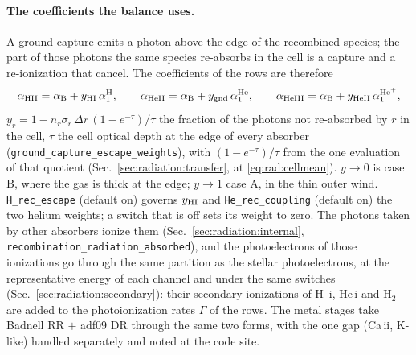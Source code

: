 \paragraph{The coefficients the balance uses.} A ground capture emits a
photon above the edge of the recombined species; the part of those photons
the same species re-absorbs in the cell is a capture and a re-ionization
that cancel. The coefficients of the rows are therefore
\begin{equation}
\alpha_{\rm HII} = \alpha_{\rm B} + y_{\rm HI}\,\alpha_1^{\rm H},\qquad
\alpha_{\rm HeII} = \alpha_{\rm B} + y_{\rm gnd}\,\alpha_1^{\rm He},\qquad
\alpha_{\rm HeIII} = \alpha_{\rm B} + y_{\rm HeII}\,\alpha_1^{\rm He^+},
\label{eq:ion:netalpha}
\end{equation}
$y_r = 1 - n_r\sigma_r\,\Delta r\,(1-e^{-\tau})/\tau$ the fraction of the
photons not re-absorbed by $r$ in the cell, $\tau$ the cell optical depth
at the edge of every absorber (\texttt{ground\_capture\_escape\_weights}),
with $(1-e^{-\tau})/\tau$ from the one evaluation of that quotient
(Sec.~\ref{sec:radiation:transfer}, at \eqref{eq:rad:cellmean}).
$y\to0$ is case B, where the gas is thick at the edge; $y\to1$ case A, in
the thin outer wind. \texttt{H\_rec\_escape} (default on) governs
$y_{\rm HI}$ and \texttt{He\_rec\_coupling} (default on) the two helium
weights; a switch that is off sets its weight to zero. The photons taken by
other absorbers ionize them (Sec.~\ref{sec:radiation:internal},
\texttt{recombination\_radiation\_absorbed}), and the photoelectrons of those
ionizations go through the same partition as the stellar photoelectrons, at
the representative energy of each channel and under the same switches
(Sec.~\ref{sec:radiation:secondary}): their secondary ionizations of H\,{\sc
i}, He\,{\sc i} and H$_2$ are added to the photoionization rates $\Gamma$ of
the rows. The metal stages take Badnell RR $+$ adf09
DR through the same two forms, with the one gap (Ca\,{\sc ii}, K-like)
handled separately and noted at the code site.

